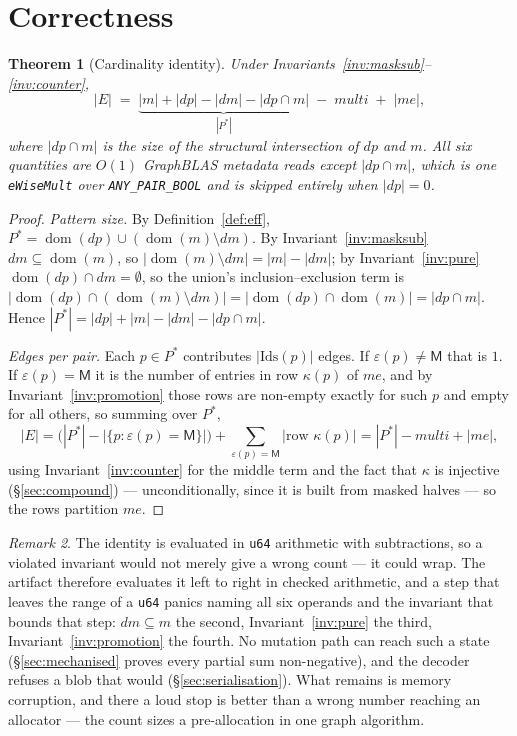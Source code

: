 \documentclass[11pt,a4paper]{article}
\theoremstyle{plain}
\newtheorem{theorem}{Theorem}
\theoremstyle{definition}
\theoremstyle{remark}
\newtheorem{remark}[theorem]{Remark}
\newcommand{\M}{\mathsf{M}}
\newcommand{\dom}{\operatorname{dom}}
\begin{document}
\section{Correctness}
\label{sec:correctness}

\begin{theorem}[Cardinality identity]
\label{thm:count}
Under Invariants~\ref{inv:masksub}--\ref{inv:counter},
\[
  |E| \;=\; \underbrace{|m| + |dp| - |dm| - |dp \cap m|}_{|P^{\ast}|}
            \;-\; \textit{multi} \;+\; |me| ,
\]
where $|dp \cap m|$ is the size of the structural intersection of $dp$ and
$m$. All six quantities are $O(1)$ GraphBLAS metadata reads except
$|dp \cap m|$, which is one \texttt{eWiseMult} over
\texttt{ANY\_PAIR\_BOOL} and is skipped entirely when $|dp| = 0$.
\end{theorem}

\begin{proof}
\emph{Pattern size.} By Definition~\ref{def:eff},
$P^{\ast} = \dom(dp) \cup (\dom(m) \setminus dm)$. By
Invariant~\ref{inv:masksub} $dm \subseteq \dom(m)$, so
$|\dom(m) \setminus dm| = |m| - |dm|$; by Invariant~\ref{inv:pure}
$\dom(dp) \cap dm = \emptyset$, so the union's inclusion--exclusion term is
$|\dom(dp) \cap (\dom(m)\setminus dm)| = |\dom(dp) \cap \dom(m)| = |dp \cap m|$.
Hence $|P^{\ast}| = |dp| + |m| - |dm| - |dp \cap m|$.

\emph{Edges per pair.} Each $p \in P^{\ast}$ contributes $|\mathrm{Ids}(p)|$
edges. If $\varepsilon(p) \neq \M$ that is $1$. If $\varepsilon(p) = \M$ it is
the number of entries in row $\kappa(p)$ of $me$, and by
Invariant~\ref{inv:promotion} those rows are non-empty exactly for such $p$
and empty for all others, so summing over $P^{\ast}$,
\[
  |E| = \bigl(|P^{\ast}| - |\{p : \varepsilon(p) = \M\}|\bigr)
        + \sum_{\varepsilon(p) = \M} |\text{row } \kappa(p)|
      = |P^{\ast}| - \textit{multi} + |me| ,
\]
using Invariant~\ref{inv:counter} for the middle term and the fact that
$\kappa$ is injective (\S\ref{sec:compound}) --- unconditionally, since it is
built from masked halves --- so the rows partition $me$.
\end{proof}

\begin{remark}
The identity is evaluated in \texttt{u64} arithmetic with subtractions, so a
violated invariant would not merely give a wrong count --- it could wrap. The
artifact therefore evaluates it left to right in checked arithmetic, and a
step that leaves the range of a \texttt{u64} panics naming all six operands
and the invariant that bounds that step: $dm \subseteq m$ the second,
Invariant~\ref{inv:pure} the third, Invariant~\ref{inv:promotion} the fourth.
No mutation path can reach such a state (\S\ref{sec:mechanised} proves every
partial sum non-negative), and the decoder refuses a blob that would
(\S\ref{sec:serialisation}). What remains is memory corruption, and there a
loud stop is better than a wrong number reaching an allocator --- the count
sizes a pre-allocation in one graph algorithm.
\end{remark}
\end{document}
